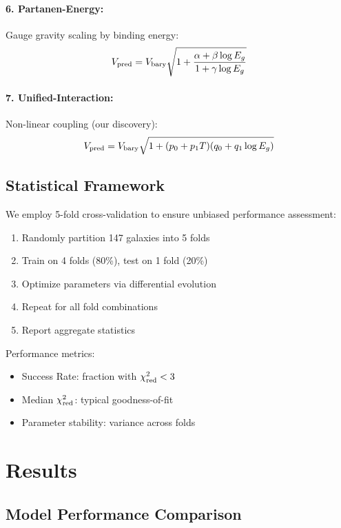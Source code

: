 \documentclass[aps,prd,twocolumn,superscriptaddress,nofootinbib,longbibliography]{revtex4-2}
\begin{document}
\paragraph{6. Partanen-Energy:} Gauge gravity scaling by binding energy:
\begin{equation}
V_{\rm pred} = V_{\rm bary} \sqrt{1 + \frac{\alpha + \beta \log E_g}{1 + \gamma \log E_g}}
\end{equation}

\paragraph{7. Unified-Interaction:} Non-linear coupling (our discovery):
\begin{equation}
V_{\rm pred} = V_{\rm bary} \sqrt{1 + (p_0 + p_1 T)(q_0 + q_1 \log E_g)}
\label{eq:unified}
\end{equation}

\subsection{Statistical Framework}

We employ 5-fold cross-validation to ensure unbiased performance assessment:
\begin{enumerate}
\item Randomly partition 147 galaxies into 5 folds
\item Train on 4 folds (80\%), test on 1 fold (20\%)
\item Optimize parameters via differential evolution \cite{Storn1997}
\item Repeat for all fold combinations
\item Report aggregate statistics
\end{enumerate}

Performance metrics:
\begin{itemize}
\item Success Rate: fraction with $\chi^2_{\rm red} < 3$
\item Median $\chi^2_{\rm red}$: typical goodness-of-fit
\item Parameter stability: variance across folds
\end{itemize}

\section{Results}

\subsection{Model Performance Comparison}
\end{document}
